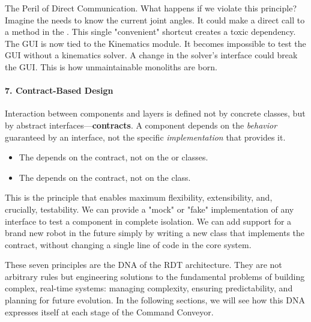 \begin{dangerbox}{The Peril of Direct Communication.}
    What happens if we violate this principle? Imagine the  needs to know the current joint angles. It could make a direct call to a method in the . This single "convenient" shortcut creates a toxic dependency. The GUI is now tied to the Kinematics module. It becomes impossible to test the GUI without a kinematics solver. A change in the solver's interface could break the GUI. This is how unmaintainable monoliths are born.
\end{dangerbox}

\paragraph{7. Contract-Based Design}
Interaction between components and layers is defined not by concrete classes, but by abstract interfaces—\textbf{contracts}. A component depends on the \textit{behavior} guaranteed by an interface, not the specific \textit{implementation} that provides it.
\begin{itemize}
    \item The  depends on the  contract, not on the  or  classes.
    \item The  depends on the  contract, not on the  class.
\end{itemize}
This is the principle that enables maximum flexibility, extensibility, and, crucially, testability. We can provide a "mock" or "fake" implementation of any interface to test a component in complete isolation. We can add support for a brand new robot in the future simply by writing a new class that implements the  contract, without changing a single line of code in the core system.

\vspace{1cm} %
These seven principles are the DNA of the RDT architecture. They are not arbitrary rules but engineering solutions to the fundamental problems of building complex, real-time systems: managing complexity, ensuring predictability, and planning for future evolution. In the following sections, we will see how this DNA expresses itself at each stage of the Command Conveyor.


